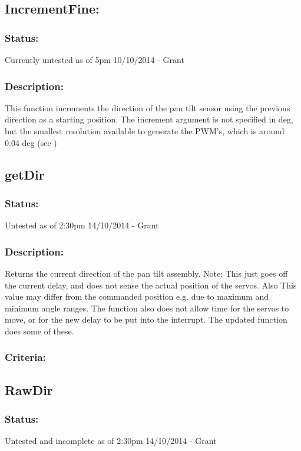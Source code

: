\documentclass[]{report}
\begin{document}
\subsection{IncrementFine:}
\subsubsection{Status:}
Currently untested as of 5pm 10/10/2014 - Grant

\subsubsection{Description:}
This function increments the direction of the pan tilt sensor using the previous direction as a starting position. The increment argument is not specified in deg, but the smallest resolution available to generate the PWM's, which is around 0.04 deg (see )

\subsection{getDir}
\subsubsection{Status:}
Untested as of 2:30pm 14/10/2014 - Grant

\subsubsection{Description:}
Returns the current direction of the pan tilt assembly. Note: This just goes off the current delay, and does not sense the actual position of the servos. Also This value may differ from the commanded position e.g. due to maximum and minimum angle ranges. The function also does not allow time for the servos to move, or for the new delay to be put into the interrupt. The updated function does some of these.

\subsubsection{Criteria:}

\subsection{RawDir}
\subsubsection{Status:}
Untested and incomplete as of 2:30pm 14/10/2014 - Grant
\end{document}
